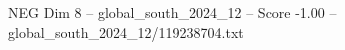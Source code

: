 \begin{textsample}{NEG Dim 8 – global\_south\_2024\_12 – Score -1.00 – global\_south\_2024\_12/119238704.txt}
\end{textsample}

